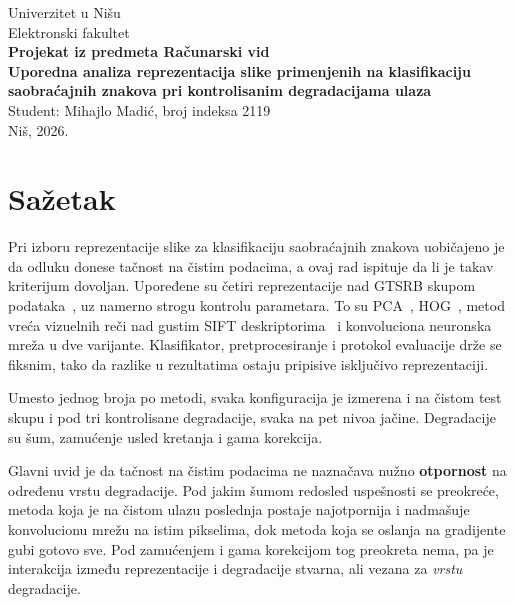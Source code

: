 \documentclass[11pt,a4paper]{article}
\begin{document}
\begin{center}
{\Large Univerzitet u Nišu\\Elektronski fakultet}\\[1.2cm]

{\LARGE \textbf{Projekat iz predmeta Računarski vid}}\\[0.6cm]

{\Large \textbf{Uporedna analiza reprezentacija slike primenjenih na klasifikaciju saobraćajnih znakova pri kontrolisanim degradacijama ulaza}}\\[1.2cm]

{\large Student: Mihajlo Madić, broj indeksa 2119}\\[0.3cm]
{\large Niš, 2026.}
\end{center}

\vspace{0.6cm}

\section*{Sažetak}

Pri izboru reprezentacije slike za klasifikaciju saobraćajnih znakova uobičajeno je da odluku
donese tačnost na čistim podacima, a ovaj rad ispituje da li je takav kriterijum dovoljan.
Upoređene su četiri
reprezentacije nad GTSRB skupom podataka~\cite{gtsrb}, uz namerno strogu kontrolu parametara. To su
PCA~\cite{eigenfaces}, HOG~\cite{hog}, metod vreća vizuelnih reči nad gustim SIFT
deskriptorima~\cite{sift, bovw} i konvoluciona neuronska mreža u dve varijante. Klasifikator, pretprocesiranje i
protokol evaluacije drže se fiksnim, tako da razlike u
rezultatima ostaju pripisive isključivo reprezentaciji.

Umesto jednog broja po metodi, svaka konfiguracija je izmerena i na čistom test skupu i pod
tri kontrolisane degradacije, svaka na pet nivoa jačine. Degradacije su šum, zamućenje usled
kretanja i gama korekcija.

Glavni uvid je da tačnost na čistim podacima ne naznačava nužno \textbf{otpornost} na određenu vrstu degradacije. 
Pod jakim šumom redosled uspešnosti se preokreće, metoda koja je na čistom ulazu poslednja postaje najotpornija
i nadmašuje konvolucionu mrežu na istim pikselima, dok metoda koja se oslanja na gradijente
gubi gotovo sve. Pod zamućenjem i gama korekcijom tog preokreta nema, pa je interakcija između
reprezentacije i degradacije stvarna, ali vezana za \emph{vrstu} degradacije.
\end{document}
